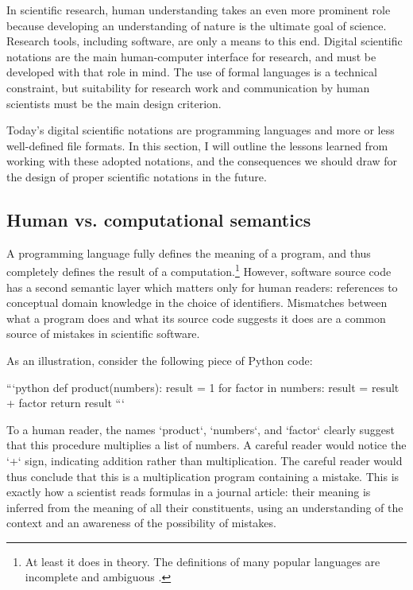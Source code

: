 In scientific research, human understanding takes an even more prominent role because developing an understanding of nature is the ultimate goal of science. Research tools, including software, are only a means to this end. Digital scientific notations are the main human-computer interface for research, and must be developed with that role in mind. The use of formal languages is a technical constraint, but suitability for research work and communication by human scientists must be the main design criterion.

Today's digital scientific notations are programming languages and more or less well-defined file formats. In this section, I will outline the lessons learned from working with these adopted notations, and the consequences we should draw for the design of proper scientific notations in the future.

\subsection{Human vs. computational semantics}
\label{HCI-semantics}

A programming language fully defines the meaning of a program, and thus completely defines the result of a computation.\footnote{At least it does in theory. The definitions of many popular languages are incomplete and ambiguous \cite{regehr_guide_2010}.} However, software source code has a second semantic layer which matters only for human readers: references to conceptual domain knowledge in the choice of identifiers. Mismatches between what a program does and what its source code suggests it does are a common source of mistakes in scientific software.

As an illustration, consider the following piece of Python code:

```python
def product(numbers):
    result = 1
    for factor in numbers:
        result = result + factor
    return result
```

To a human reader, the names `product`, `numbers`, and `factor` clearly suggest that this procedure multiplies a list of numbers. A careful reader would notice the `+` sign, indicating addition rather than multiplication. The careful reader would thus conclude that this is a multiplication program containing a mistake. This is exactly how a scientist reads formulas in a journal article: their meaning is inferred from the meaning of all their constituents, using an understanding of the context and an awareness of the possibility of mistakes.

